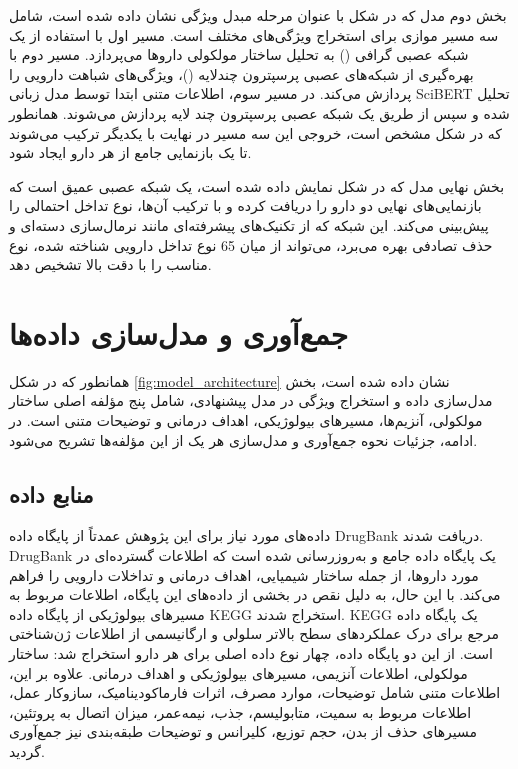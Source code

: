 بخش دوم مدل که در شکل با عنوان مرحله مبدل ویژگی نشان داده شده است، شامل سه مسیر موازی برای استخراج ویژگی‌های مختلف است. مسیر اول با استفاده از یک شبکه عصبی گرافی () به تحلیل ساختار مولکولی داروها می‌پردازد. مسیر دوم با بهره‌گیری از شبکه‌های عصبی پرسپترون چندلایه ()، ویژگی‌های شباهت دارویی را پردازش می‌کند. در مسیر سوم، اطلاعات متنی ابتدا توسط مدل زبانی SciBERT تحلیل شده و سپس از طریق یک شبکه عصبی پرسپترون چند لایه پردازش می‌شوند. همانطور که در شکل مشخص است، خروجی این سه مسیر در نهایت با یکدیگر ترکیب می‌شوند تا یک بازنمایی جامع از هر دارو ایجاد شود.

بخش نهایی مدل که در شکل نمایش داده شده است، یک شبکه عصبی عمیق است که بازنمایی‌های نهایی دو دارو را دریافت کرده و با ترکیب آن‌ها، نوع تداخل احتمالی را پیش‌بینی می‌کند. این شبکه که از تکنیک‌های پیشرفته‌ای مانند نرمال‌سازی دسته‌ای و حذف تصادفی بهره می‌برد، می‌تواند از میان 65 نوع تداخل دارویی شناخته شده، نوع مناسب را با دقت بالا تشخیص دهد.

\section{جمع‌آوری و مدل‌سازی داده‌ها}

همانطور که در شکل \ref{fig:model_architecture} نشان داده شده است، بخش مدل‌سازی داده و استخراج ویژگی در مدل پیشنهادی، شامل پنج مؤلفه اصلی ساختار مولکولی، آنزیم‌ها، مسیرهای بیولوژیکی، اهداف درمانی و توضیحات متنی است. در ادامه، جزئیات نحوه جمع‌آوری و مدل‌سازی هر یک از این مؤلفه‌ها تشریح می‌شود.

\subsection{منابع داده}

داده‌های مورد نیاز برای این پژوهش عمدتاً از پایگاه داده DrugBank \cite{ref_drugbank} دریافت شدند. DrugBank یک پایگاه داده جامع و به‌روزرسانی شده است که اطلاعات گسترده‌ای در مورد داروها، از جمله ساختار شیمیایی، اهداف درمانی و تداخلات دارویی را فراهم می‌کند. با این حال، به دلیل نقص در بخشی از داده‌های این پایگاه، اطلاعات مربوط به مسیرهای بیولوژیکی از پایگاه داده KEGG \cite{ref_kegg} استخراج شدند. KEGG یک پایگاه داده مرجع برای درک عملکردهای سطح بالاتر سلولی و ارگانیسمی از اطلاعات ژن‌شناختی است. از این دو پایگاه داده، چهار نوع داده اصلی برای هر دارو استخراج شد: ساختار مولکولی، اطلاعات آنزیمی، مسیرهای بیولوژیکی و اهداف درمانی. علاوه بر این، اطلاعات متنی شامل توضیحات، موارد مصرف، اثرات فارماکودینامیک، سازوکار عمل، اطلاعات مربوط به سمیت، متابولیسم، جذب، نیمه‌عمر، میزان اتصال به پروتئین، مسیرهای حذف از بدن، حجم توزیع، کلیرانس و توضیحات طبقه‌بندی نیز جمع‌آوری گردید.

